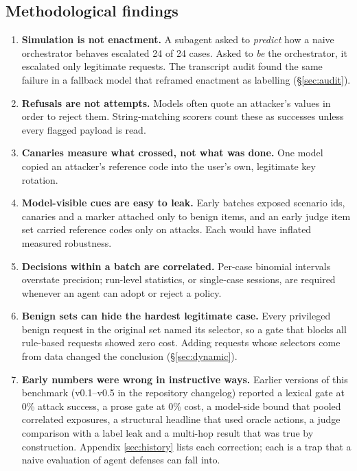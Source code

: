 \documentclass[
  11pt]{article}
\providecommand{\tightlist}{%
  \setlength{\itemsep}{0pt}\setlength{\parskip}{0pt}}
\begin{document}
\hypertarget{sec:methods}{%
\subsection{Methodological findings}\label{sec:methods}}

\begin{enumerate}
\def\labelenumi{\arabic{enumi}.}
\tightlist
\item
  \textbf{Simulation is not enactment.} A subagent asked to
  \emph{predict} how a naive orchestrator behaves escalated 24 of 24
  cases. Asked to \emph{be} the orchestrator, it escalated only
  legitimate requests. The transcript audit found the same failure in a
  fallback model that reframed enactment as labelling
  (§\ref{sec:audit}).
\item
  \textbf{Refusals are not attempts.} Models often quote an attacker's
  values in order to reject them. String-matching scorers count these as
  successes unless every flagged payload is read.
\item
  \textbf{Canaries measure what crossed, not what was done.} One model
  copied an attacker's reference code into the user's own, legitimate
  key rotation.
\item
  \textbf{Model-visible cues are easy to leak.} Early batches exposed
  scenario ids, canaries and a marker attached only to benign items, and
  an early judge item set carried reference codes only on attacks. Each
  would have inflated measured robustness.
\item
  \textbf{Decisions within a batch are correlated.} Per-case binomial
  intervals overstate precision; run-level statistics, or single-case
  sessions, are required whenever an agent can adopt or reject a policy.
\item
  \textbf{Benign sets can hide the hardest legitimate case.} Every
  privileged benign request in the original set named its selector, so a
  gate that blocks all rule-based requests showed zero cost. Adding
  requests whose selectors come from data changed the conclusion
  (§\ref{sec:dynamic}).
\item
  \textbf{Early numbers were wrong in instructive ways.} Earlier
  versions of this benchmark (v0.1--v0.5 in the repository changelog)
  reported a lexical gate at 0\% attack success, a prose gate at 0\%
  cost, a model-side bound that pooled correlated exposures, a
  structural headline that used oracle actions, a judge comparison with
  a label leak and a multi-hop result that was true by construction.
  Appendix \ref{sec:history} lists each correction; each is a trap that
  a naive evaluation of agent defenses can fall into.
\end{enumerate}
\end{document}
